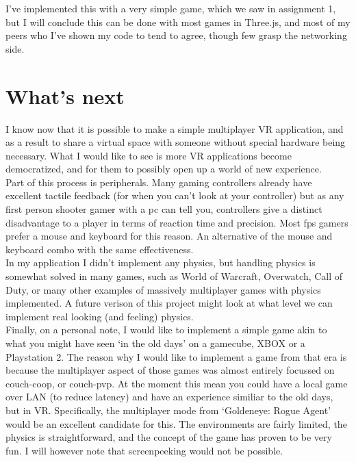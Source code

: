 \documentclass{article}
\begin{document}
	I've implemented this with a very simple game, which we saw in assignment 1, but I will conclude this can be done with most games in Three.js, and most of my peers who I've shown my code to tend to agree, though few grasp the networking side. \clearpage


\section{What's next}

	I know now that it is possible to make a simple multiplayer VR application, and as a result to share a virtual space with someone without special hardware being necessary.  What I would like to see is more VR applications become democratized, and for them to possibly open up a world of new experience. \\

	Part of this process is peripherals.  Many gaming controllers already have excellent tactile feedback (for when you can't look at your controller) but as any first person shooter gamer with a pc can tell you, controllers give a distinct disadvantage to a player in terms of reaction time and precision.  Most fps gamers prefer a mouse and keyboard for this reason.  An alternative of the mouse and keyboard combo with the same effectiveness. \\

	In my application I didn't implement any physics, but handling physics is somewhat solved in many games, such as World of Warcraft, Overwatch, Call of Duty, or many other examples of massively multiplayer games with physics implemented.  A future verison of this project might look at what level we can implement real looking (and feeling) physics. \\

	Finally, on a personal note, I would like to implement a simple game akin to what you might have seen `in the old days' on a gamecube, XBOX or a Playstation 2.  The reason why I would like to implement a game from that era is because the multiplayer aspect of those games was almost entirely focussed on couch-coop, or couch-pvp.  At the moment this mean you could have a local game over LAN (to reduce latency) and have an experience similiar to the old days, but in VR.  Specifically, the multiplayer mode from `Goldeneye: Rogue Agent' would be an excellent candidate for this.  The environments are fairly limited, the physics is straightforward, and the concept of the game has proven to be very fun.  I will however note that screenpeeking would not be possible.

	

\end{document}
